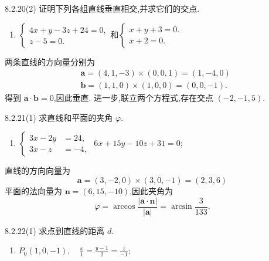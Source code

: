 \begin{exercise}{8.2.20(2)}
    证明下列各组直线垂直相交,并求它们的交点.
    \begin{enumerate}
        \item $\begin{cases}
            4x+y-3z+24=0,\\
            z-5=0.
        \end{cases}$和$\begin{cases}
            x+y+3=0.\\
            x+2=0.
        \end{cases}$
    \end{enumerate}
\end{exercise}

\begin{solution}
    两条直线的方向量分别为
\begin{align*}
    & \bm{a} = (4, 1, -3) \times (0, 0, 1) = (1, -4, 0)\\
    & \bm{b} = (1, 1, 0) \times (1, 0, 0) = (0, 0, -1).
\end{align*}
得到 $\bm{a} \cdot \bm{b} = 0$,因此垂直.
进一步,联立两个方程式,存在交点 $(-2, -1, 5)$.
\end{solution}

\begin{exercise}{8.2.21(1)}
     求直线和平面的夹角 $\varphi$.
        
        \begin{enumerate}
            \item 
            $
            \left\{
            \begin{aligned}
            3x - 2y &= 24, \\
            3x - z &= -4,
            \end{aligned}
            \right.$
            \quad $6x + 15y - 10z + 31 = 0;$
        \end{enumerate}
\end{exercise}

\begin{solution}
    直线的方向向量为
\[
\bm{a} = (3, -2, 0) \times (3, 0, -1) = (2, 3, 6)
\]
平面的法向量为 $\bm{n} = (6, 15, -10)$,因此夹角为
\[
\varphi = \arccos \frac{|\bm{a} \cdot \bm{n}|}{|\bm{a}|} = \arcsin \frac{3}{133}.
\]
\end{solution}


\begin{exercise}{8.2.22(1)}
    求点到直线的距离 $d$.
    
    \begin{enumerate}
        \item $P_0(1, 0, -1), \quad \frac{x}{1} = \frac{y-1}{2} = \frac{z}{-1};$
    \end{enumerate}
    \end{exercise}

